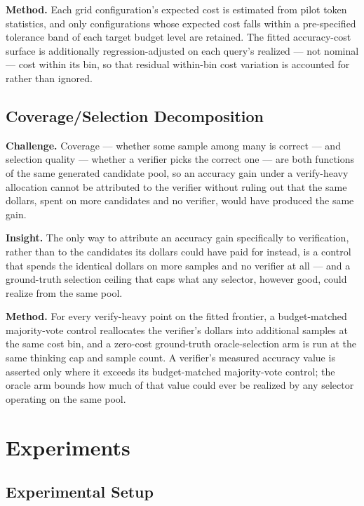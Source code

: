 \documentclass[11pt]{article}
\begin{document}
\textbf{Method.} Each grid configuration's expected cost is estimated from pilot token statistics, and only configurations whose expected cost falls within a pre-specified tolerance band of each target budget level are retained. The fitted accuracy-cost surface is additionally regression-adjusted on each query's realized --- not nominal --- cost within its bin, so that residual within-bin cost variation is accounted for rather than ignored.

\subsection{Coverage/Selection Decomposition}
\textbf{Challenge.} Coverage --- whether some sample among many is correct --- and selection quality --- whether a verifier picks the correct one --- are both functions of the same generated candidate pool, so an accuracy gain under a verify-heavy allocation cannot be attributed to the verifier without ruling out that the same dollars, spent on more candidates and no verifier, would have produced the same gain.

\textbf{Insight.} The only way to attribute an accuracy gain specifically to verification, rather than to the candidates its dollars could have paid for instead, is a control that spends the identical dollars on more samples and no verifier at all --- and a ground-truth selection ceiling that caps what any selector, however good, could realize from the same pool.

\textbf{Method.} For every verify-heavy point on the fitted frontier, a budget-matched majority-vote control reallocates the verifier's dollars into additional samples at the same cost bin, and a zero-cost ground-truth oracle-selection arm is run at the same thinking cap and sample count. A verifier's measured accuracy value is asserted only where it exceeds its budget-matched majority-vote control; the oracle arm bounds how much of that value could ever be realized by any selector operating on the same pool.

\section{Experiments}

\subsection{Experimental Setup}
\end{document}
